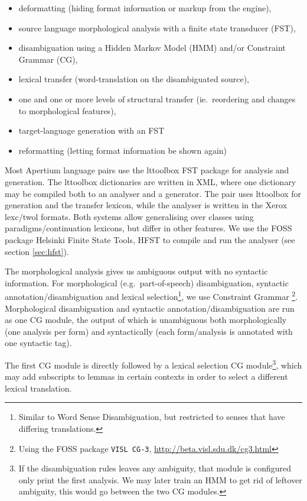 \begin{itemize}
\item deformatting (hiding format information or markup from the
  engine),
\item source language morphological analysis with a finite state
  transducer (FST),
\item disambiguation using a Hidden Markov Model (HMM) and/or
  Constraint Grammar (CG), 
\item lexical transfer (word-translation on the disambiguated source),
\item one and one or more levels of structural transfer
  (ie.~reordering and changes to morphological features), 
\item target-language generation with an FST
\item reformatting (letting format information be shown again)
\end{itemize}

Most Apertium language pairs use the lttoolbox FST package for
analysis and generation. The lttoolbox dictionaries are written in
XML, where one dictionary may be compiled both to an analyser and a
generator. The \smenob{} pair uses lttoolbox for \nob{} generation and
the transfer lexicon, while the \sme{} analyser is written in the
Xerox lexc/twol formats\citep{beesley2003fsm}. Both systems allow
generalising over classes using paradigms/continuation lexicons, but
differ in other features. We use the FOSS package Helsinki Finite
State Tools, HFST \citep{linden2011hfst} to compile and run the
analyser (see section \ref{sec:hfst}).

The morphological analysis gives us ambiguous output with no syntactic
information. For morphological (e.g.~part-of-speech) disambiguation,
syntactic annotation/disambiguation and lexical
selection\footnote{Similar to Word Sense Disambiguation, but
  restricted to senses that have differing translations.}, we use
Constraint Grammar \citep{karlsson1990cgf}\footnote{Using the FOSS
  package {\tt \small VISL CG-3},
  \href{http://beta.visl.sdu.dk/cg3.html}{http://beta.visl.sdu.dk/cg3.html}}.
Morphological disambiguation and syntactic annotation/disambiguation
are run as one CG module, the output of which is unambiguous both
morphologically (one analysis per form) and syntactically (each
form/analysis is annotated with one syntactic tag).

The first CG module is directly followed by a lexical selection CG
module\footnote{If the disambiguation rules leaves any ambiguity, that
  module is configured only print the first analysis. We may later
  train an HMM to get rid of leftover ambiguity, this would go between
  the two CG modules.}, which may add subscripts to lemmas in certain
contexts in order to select a different lexical translation. 

